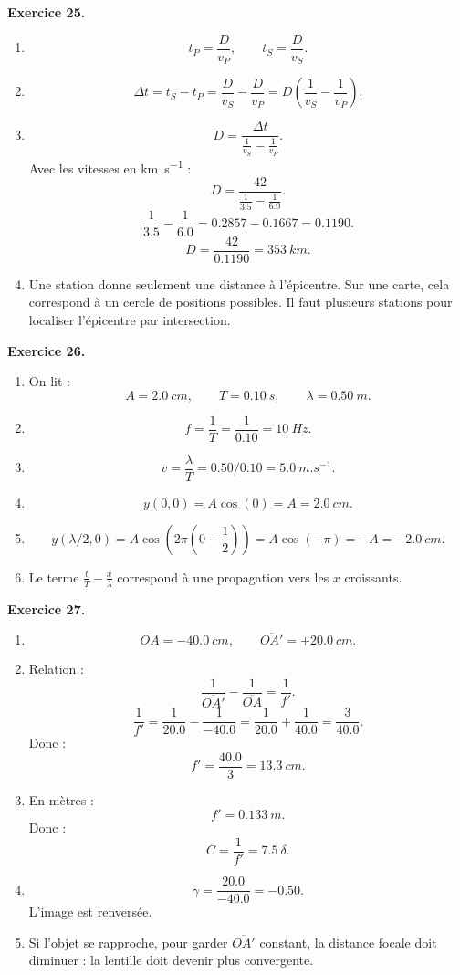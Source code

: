 \documentclass[11pt,a4paper]{article}
\newcommand{\corr}[2]{
  \begin{correctionbox}
  \textbf{Exercice #1.} #2
  \end{correctionbox}
}
\begin{document}
\corr{25}{
\begin{enumerate}
  \item
  \[
  t_P=\frac{D}{v_P},\qquad t_S=\frac{D}{v_S}.
  \]
  \item
  \[
  \Delta t=t_S-t_P=\frac{D}{v_S}-\frac{D}{v_P}
  =D\left(\frac{1}{v_S}-\frac{1}{v_P}\right).
  \]
  \item
  \[
  D=\frac{\Delta t}{\frac{1}{v_S}-\frac{1}{v_P}}.
  \]
  Avec les vitesses en \si{km.s^{-1}} :
  \[
  D=\frac{42}{\frac{1}{3.5}-\frac{1}{6.0}}.
  \]
  \[
  \frac{1}{3.5}-\frac{1}{6.0}=0.2857-0.1667=0.1190.
  \]
  \[
  D=\frac{42}{0.1190}=\SI{353}{km}.
  \]
  \item Une station donne seulement une distance à l'épicentre. Sur une carte, cela correspond à un cercle de positions possibles. Il faut plusieurs stations pour localiser l'épicentre par intersection.
\end{enumerate}
}

\corr{26}{
\begin{enumerate}
  \item On lit :
  \[
  A=\SI{2.0}{cm},\qquad T=\SI{0.10}{s},\qquad \lambda=\SI{0.50}{m}.
  \]
  \item
  \[
  f=\frac{1}{T}=\frac{1}{0.10}=\SI{10}{Hz}.
  \]
  \item
  \[
  v=\frac{\lambda}{T}=0.50/0.10=\SI{5.0}{m.s^{-1}}.
  \]
  \item
  \[
  y(0,0)=A\cos(0)=A=\SI{2.0}{cm}.
  \]
  \item
  \[
  y(\lambda/2,0)=A\cos\left(2\pi\left(0-\frac{1}{2}\right)\right)
  =A\cos(-\pi)=-A=-\SI{2.0}{cm}.
  \]
  \item Le terme $\frac{t}{T}-\frac{x}{\lambda}$ correspond à une propagation vers les $x$ croissants.
\end{enumerate}
}

\corr{27}{
\begin{enumerate}
  \item
  \[
  \overline{OA}=-\SI{40.0}{cm},\qquad \overline{OA'}=+\SI{20.0}{cm}.
  \]
  \item Relation :
  \[
  \frac{1}{\overline{OA'}}-\frac{1}{\overline{OA}}=\frac{1}{f'}.
  \]
  \[
  \frac{1}{f'}=\frac{1}{20.0}-\frac{1}{-40.0}
  =\frac{1}{20.0}+\frac{1}{40.0}
  =\frac{3}{40.0}.
  \]
  Donc :
  \[
  f'=\frac{40.0}{3}=\SI{13.3}{cm}.
  \]
  \item En mètres :
  \[
  f'=\SI{0.133}{m}.
  \]
  Donc :
  \[
  C=\frac{1}{f'}=\SI{7.5}{\delta}.
  \]
  \item
  \[
  \gamma=\frac{20.0}{-40.0}=-0.50.
  \]
  L'image est renversée.
  \item Si l'objet se rapproche, pour garder $\overline{OA'}$ constant, la distance focale doit diminuer : la lentille doit devenir plus convergente.
\end{enumerate}
}
\end{document}
